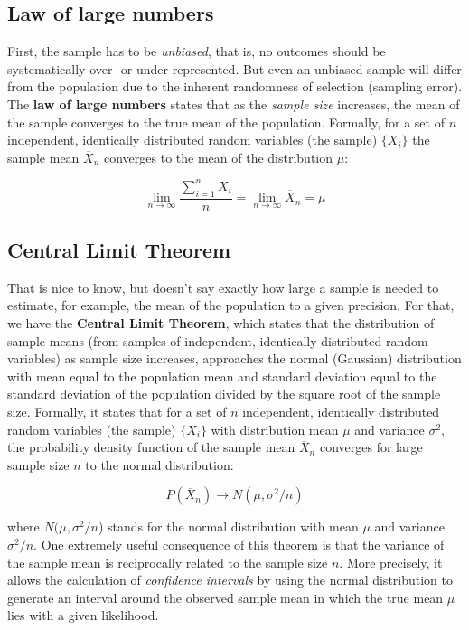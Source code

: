\documentclass[
  letterpaper,
  DIV=11,
  numbers=noendperiod]{scrreprt}
\begin{document}
\hypertarget{law-of-large-numbers}{%
\subsection{Law of large numbers}\label{law-of-large-numbers}}

First, the sample has to be \emph{unbiased}, that is, no outcomes should
be systematically over- or under-represented. But even an unbiased
sample will differ from the population due to the inherent randomness of
selection (sampling error). The \textbf{law of large numbers} states
that as the \emph{sample size} increases, the mean of the sample
converges to the true mean of the population. Formally, for a set of
\(n\) independent, identically distributed random variables (the sample)
\(\{X_i\}\) the sample mean \(\overline{X}_n\) converges to the mean of
the distribution \(\mu\):

\[ 
\lim _{n \to \infty} \frac{\sum_{i=1}^n {X_i}}{n} = \lim _{n \to \infty} \overline{X}_n = \mu
\]

\hypertarget{central-limit-theorem}{%
\subsection{Central Limit Theorem}\label{central-limit-theorem}}

That is nice to know, but doesn't say exactly how large a sample is
needed to estimate, for example, the mean of the population to a given
precision. For that, we have the \textbf{Central Limit Theorem}, which
states that the distribution of sample means (from samples of
independent, identically distributed random variables) as sample size
increases, approaches the normal (Gaussian) distribution with mean equal
to the population mean and standard deviation equal to the standard
deviation of the population divided by the square root of the sample
size. Formally, it states that for a set of \(n\) independent,
identically distributed random variables (the sample) \(\{X_i\}\) with
distribution mean \(\mu\) and variance \(\sigma^2\), the probability
density function of the sample mean \(\overline{X}_n\) converges for
large sample size \(n\) to the normal distribution:

\[ 
P(\overline{X}_n) \to N(\mu, \sigma^2/n)
\]

where \(N(\mu, \sigma^2/n\)) stands for the normal distribution with
mean \(\mu\) and variance \(\sigma^2/n\). One extremely useful
consequence of this theorem is that the variance of the sample mean is
reciprocally related to the sample size \(n\). More precisely, it allows
the calculation of \emph{confidence intervals} by using the normal
distribution to generate an interval around the observed sample mean in
which the true mean \(\mu\) lies with a given likelihood.
\end{document}
